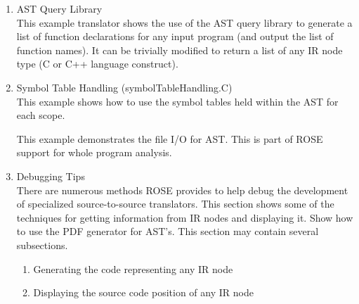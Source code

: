 \begin{itemize}
\begin{enumerate}
\begin{enumerate}
\begin{enumerate}
              This is similar to the Classic Object-Oriented Visitor Pattern on the AST.
          \item IR node Type Traversal on Memory Pools \\
              This is a specialized traversal which visits each type of IR node, but one
              one of each type of IR nodes. This specialized traversal is useful for
              building tools that call static member functions on each type or IR node.
              A number of memory based tools for ROSE are built using this traversal.
        \end{enumerate}

     \end{enumerate}

     \item AST Query Library \\
           This example translator shows the use of the AST query library to generate
           a list of function declarations for any input program (and output the list
           of function names).  It can be trivially modified to return a list of any
           IR node type (C or C++ language construct).

     \item Symbol Table Handling (symbolTableHandling.C) \\
           This example shows how to use the symbol tables held within the AST for each scope.

           This example demonstrates the file I/O for AST.  This is part of
           ROSE support for whole program analysis.

     \item Debugging Tips \\
           There are numerous methods ROSE provides to help debug the 
           development of specialized source-to-source translators.
           This section shows some of the techniques for getting
           information from IR nodes and displaying it.  Show how to 
           use the PDF generator for AST's.  This section may
           contain several subsections.
     \begin{enumerate}
          \item Generating the code representing any IR node
          \item Displaying the source code position of any IR node
     \end{enumerate}



  \end{enumerate}


\end{itemize}
